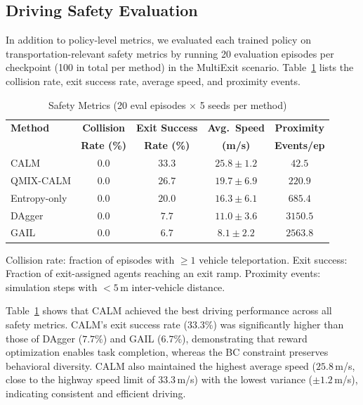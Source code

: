 \documentclass[journal]{IEEEtran}
\begin{document}
\subsection{Driving Safety Evaluation}

In addition to policy-level metrics, we evaluated each trained policy on transportation-relevant safety metrics by running 20 evaluation episodes per checkpoint (100 in total per method) in the MultiExit scenario. Table~\ref{tab:safety} lists the collision rate, exit success rate, average speed, and proximity events.

\begin{table}[t]
\centering
\caption{Safety Metrics (20 eval episodes $\times$ 5 seeds per method)}
\label{tab:safety}
\footnotesize
\begin{tabular}{lcccc}
\toprule
\textbf{Method} & \textbf{Collision} & \textbf{Exit Success} & \textbf{Avg.\ Speed} & \textbf{Proximity} \\
                 & \textbf{Rate (\%)} & \textbf{Rate (\%)}    & \textbf{(m/s)}       & \textbf{Events/ep} \\
\midrule
CALM       & $\mathbf{0.0}$  & $\mathbf{33.3}$  & $\mathbf{25.8 \pm 1.2}$  & $\mathbf{42.5}$  \\
QMIX-CALM  & $0.0$  & $26.7$  & $19.7 \pm 6.9$  & $220.9$  \\
Entropy-only & $0.0$ & $20.0$ & $16.3 \pm 6.1$  & $685.4$  \\
DAgger     & $0.0$  & $7.7$  & $11.0 \pm 3.6$  & $3150.5$  \\
GAIL       & $0.0$  & $6.7$  & $8.1 \pm 2.2$  & $2563.8$  \\
\bottomrule
\end{tabular}
\vspace{1mm}
\parbox{\columnwidth}{\scriptsize Collision rate: fraction of episodes with $\geq 1$ vehicle teleportation. Exit success: Fraction of exit-assigned agents reaching an exit ramp. Proximity events: simulation steps with $<5$\,m inter-vehicle distance.}
\end{table}

Table~\ref{tab:safety} shows that CALM achieved the best driving performance across all safety metrics. CALM's exit success rate ($33.3\%$) was significantly higher than those of DAgger ($7.7\%$) and GAIL ($6.7\%$), demonstrating that reward optimization enables task completion, whereas the BC constraint preserves behavioral diversity. CALM also maintained the highest average speed ($25.8$\,m/s, close to the highway speed limit of $33.3$\,m/s) with the lowest variance ($\pm 1.2$\,m/s), indicating consistent and efficient driving.
\end{document}
